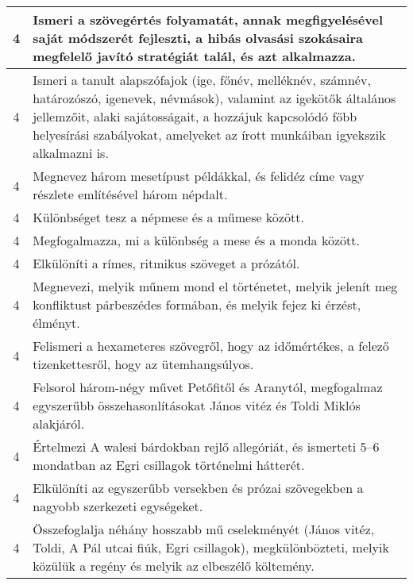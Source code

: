 \begin{longtable}{c | p{12cm} }
                                
                                          4 &  Ismeri a szövegértés folyamatát, annak megfigyelésével saját módszerét fejleszti, a hibás olvasási szokásaira megfelelő javító stratégiát talál, és azt alkalmazza. \\ \hline
                                          4 &  Ismeri a tanult alapszófajok (ige, főnév, melléknév, számnév, határozószó, igenevek, névmások), valamint az igekötők általános jellemzőit, alaki sajátosságait, a hozzájuk kapcsolódó főbb helyesírási szabályokat, amelyeket az írott munkáiban igyekszik alkalmazni is. \\ \hline
                                          4 &  Megnevez három mesetípust példákkal, és felidéz címe vagy részlete említésével három népdalt. \\ \hline
                                          4 &  Különbséget tesz a népmese és a műmese között. \\ \hline
                                          4 &  Megfogalmazza, mi a különbség a mese és a monda között. \\ \hline
                                          4 &  Elkülöníti a rímes, ritmikus szöveget a prózától. \\ \hline
                                          4 &  Megnevezi, melyik műnem mond el történetet, melyik jelenít meg konfliktust párbeszédes formában, és melyik fejez ki érzést, élményt. \\ \hline
                                          4 &  Felismeri a hexameteres szövegről, hogy az időmértékes, a felező tizenkettesről, hogy az ütemhangsúlyos. \\ \hline
                                          4 &  Felsorol három-négy művet Petőfitől és Aranytól, megfogalmaz egyszerűbb  összehasonlításokat János vitéz és Toldi Miklós alakjáról. \\ \hline
                                          4 &  Értelmezi A walesi bárdokban rejlő allegóriát, és ismerteti 5–6 mondatban az Egri csillagok történelmi hátterét. \\ \hline
                                          4 &  Elkülöníti az egyszerűbb versekben és prózai szövegekben a nagyobb szerkezeti egységeket. \\ \hline
                                          4 &  Összefoglalja néhány hosszabb mű cselekményét (János vitéz, Toldi, A Pál utcai fiúk, Egri csillagok), megkülönbözteti, melyik közülük a regény és melyik az elbeszélő költemény. \\ \hline

\end{longtable}
